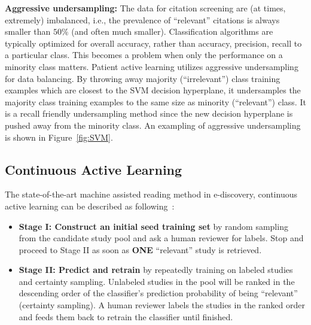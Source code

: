 \documentclass[final,twocolumn,5p]{elsarticle}
\theoremstyle{break}
\begin{document}
{\bf Aggressive undersampling: }The data for citation screening are (at times, extremely) imbalanced, i.e., the prevalence of ``relevant'' citations is always smaller than $50\%$ (and often much smaller). Classification algorithms are typically optimized for overall accuracy, rather than accuracy, precision, recall to a particular class. This becomes a problem when only the performance on a minority class matters. Patient active learning utilizes aggressive undersampling for data balancing. By throwing away majority (``irrelevant'') class training examples which are closest to the SVM decision hyperplane, it undersamples the majority class training examples to the same size as minority (``relevant'') class. It is a recall friendly undersampling method since the new decision hyperplane is pushed away from the minority class. An exampling of aggressive undersampling is shown in Figure~\ref{fig:SVM}.

\subsection{Continuous Active Learning}
\label{sect: Continuous Active Learning}

The state-of-the-art machine assisted reading method in e-discovery, continuous active learning can be described as following~\cite{cormack2014evaluation,cormack2015autonomy,tredennick2015}:

\begin{itemize}

\item
{\bf Stage I: Construct an initial seed training set} by random sampling from the candidate study pool and ask a human reviewer for labels. Stop and proceed to Stage II as soon as \textbf{ONE} ``relevant'' study is retrieved.

\item
{\bf Stage II: Predict and retrain} by repeatedly training on labeled studies and certainty sampling. Unlabeled studies in the pool will be ranked in the descending order of the classifier's prediction probability of being ``relevant'' (certainty sampling). A human reviewer labels the studies in the ranked order and feeds them back to retrain the classifier until finished.

\end{itemize}
\end{document}
